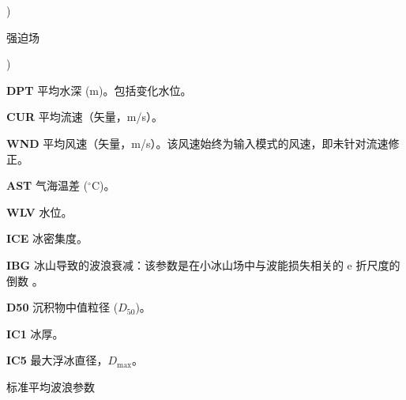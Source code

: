 \begin{list}{)\hfill}
            { \leftmargin 7mm 
             \rightmargin 0mm \itemsep \baselineskip \parsep 0mm}

\item {强迫场}

\begin{list}{)\hfill}
            { \leftmargin 8mm 
             \rightmargin 0mm \itemsep 0mm \parsep 0mm}
\item \textbf{DPT} 平均水深 (m)。包括变化水位。
\item \textbf{CUR} 平均流速（矢量，m/s）。
\item \textbf{WND} 平均风速（矢量，m/s）。该风速始终为输入模式的风速，即未针对流速修正。
\item \textbf{AST} 气海温差 ($^\circ$C)。
\item \textbf{WLV} 水位。
\item \textbf{ICE} 冰密集度。
\item \textbf{IBG} 冰山导致的波浪衰减：该参数是在小冰山场中与波能损失相关的 e 折尺度的倒数 \citep{art:Aea11}。
\item \textbf{D50} 沉积物中值粒径 ($D_{50}$)。
\item \textbf{IC1} 冰厚。
\item \textbf{IC5} 最大浮冰直径，$D_{\max}$。
\end{list}

\item{标准平均波浪参数}


\end{list}
